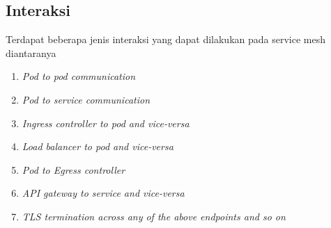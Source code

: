 \subsection{Interaksi}

Terdapat beberapa jenis interaksi yang dapat dilakukan pada service mesh diantaranya \parencite{ganguli2021}

\begin{enumerate}
  \item \textit{Pod to pod communication }
  \item \textit{Pod to service communication}
  \item \textit{Ingress controller to pod and vice-versa} 
  \item \textit{Load balancer to pod and vice-versa} 
  \item \textit{Pod to Egress controller} 
  \item \textit{API gateway to service and vice-versa} 
  \item \textit{TLS termination across any of the above endpoints and so on} 
\end{enumerate}